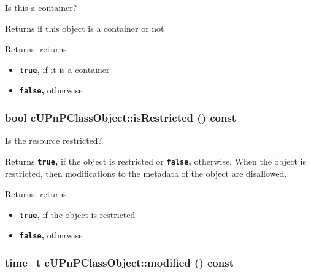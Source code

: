 Is this a container?

Returns if this object is a container or not

\begin{Desc}
\item[Returns:]returns\begin{itemize}
\item {\bf {\tt true},} if it is a container\item {\bf {\tt false},} otherwise \end{itemize}
\end{Desc}
\hypertarget{classcUPnPClassObject_a5498dca2bf917a16f2a8d78f34b6516}{
\subsubsection[{isRestricted}]{\setlength{\rightskip}{0pt plus 5cm}bool cUPnPClassObject::isRestricted () const}}
\label{classcUPnPClassObject_a5498dca2bf917a16f2a8d78f34b6516}


Is the resource restricted?

Returns {\bf {\tt true},} if the object is restricted or {\bf {\tt false},} otherwise. When the object is restricted, then modifications to the metadata of the object are disallowed.

\begin{Desc}
\item[Returns:]returns\begin{itemize}
\item {\bf {\tt true},} if the object is restricted\item {\bf {\tt false},} otherwise \end{itemize}
\end{Desc}
\hypertarget{classcUPnPClassObject_18c91d90256db85d1356db17b27f69c3}{
\subsubsection[{modified}]{\setlength{\rightskip}{0pt plus 5cm}time\_\-t cUPnPClassObject::modified () const}}
\label{classcUPnPClassObject_18c91d90256db85d1356db17b27f69c3}


